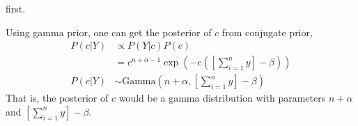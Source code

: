 \documentclass{article}
\begin{document}
\begin{enumerate}
first. 
\color{blue}
\begin{sol}
    Using gamma prior, one can get the posterior of $c$ from conjugate prior,
    \begin{align*}
        P(c|Y) &\propto P(Y|c)P(c) \\
        &= c^{n+\alpha - 1}\exp\left(-c\left(\left[\sum_{i=1}^n y\right] - \beta\right)\right)\\
        P(c|Y) &\sim \text{Gamma}\left(n+\alpha, \left[\sum_{i=1}^n y\right] - \beta\right)
    \end{align*}
That is, the posterior of $c$ would be a gamma distribution with parameters $n+\alpha$ and $\left[\sum_{i=1}^n y\right] - \beta$.
\end{sol}
\color{black}
\end{enumerate}
\end{document}
